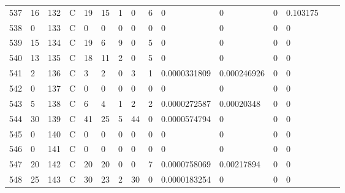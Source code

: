 \begin{longtable}{lllllllllllllll}
	537 & 16                & 132 & C   & 19                & 15                & 1                 & 0    & 6          & 0              & 0              & 0             & 0.103175     \\
	538 & 0                 & 133 & C   & 0                 & 0                 & 0                 & 0    & 0          & 0              & 0              & 0             & 0            \\
	539 & 15                & 134 & C   & 19                & 6                 & 9                 & 0    & 5          & 0              & 0              & 0             & 0            \\
	540 & 13                & 135 & C   & 18                & 11                & 2                 & 0    & 5          & 0              & 0              & 0             & 0            \\
	541 & 2                 & 136 & C   & 3                 & 2                 & 0                 & 3    & 1          & 0.0000331809   & 0.000246926    & 0             & 0            \\
	542 & 0                 & 137 & C   & 0                 & 0                 & 0                 & 0    & 0          & 0              & 0              & 0             & 0            \\
	543 & 5                 & 138 & C   & 6                 & 4                 & 1                 & 2    & 2          & 0.0000272587   & 0.00020348     & 0             & 0            \\
	544 & 30                & 139 & C   & 41                & 25                & 5                 & 44   & 0          & 0.0000574794   & 0              & 0             & 0            \\
	545 & 0                 & 140 & C   & 0                 & 0                 & 0                 & 0    & 0          & 0              & 0              & 0             & 0            \\
	546 & 0                 & 141 & C   & 0                 & 0                 & 0                 & 0    & 0          & 0              & 0              & 0             & 0            \\
	547 & 20                & 142 & C   & 20                & 20                & 0                 & 0    & 7          & 0.0000758069   & 0.00217894     & 0             & 0            \\
	548 & 25                & 143 & C   & 30                & 23                & 2                 & 30   & 0          & 0.0000183254   & 0              & 0             & 0            \\

\end{longtable}
